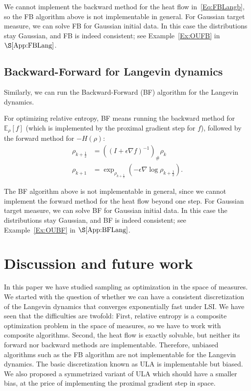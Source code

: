 \documentclass[final,12pt]{colt2018}
\newcommand{\E}{\mathbb{E}}
\begin{document}
We cannot implement the backward method for the heat flow in~\eqref{Eq:FBLangb}, so the FB algorithm above is not implementable in general.
For Gaussian target measure, we can solve FB for Gaussian initial data.
In this case the distributions stay Gaussian, and FB is indeed consistent;
see Example~\ref{Ex:OUFB} in $\S\ref{App:FBLang}$.


\subsection{Backward-Forward for Langevin dynamics}
\label{App:BFLang}

Similarly, we can run the Backward-Forward (BF) algorithm for the Langevin dynamics.

For optimizing relative entropy, BF means running the backward method for $\E_\rho[f]$ (which is implemented by the proximal gradient step for $f$), followed by the forward method for $-H(\rho)$:
\begin{subequations}\label{Eq:BFLang}
\begin{align}
\rho_{k+\frac{1}{2}} &= \left((I + \epsilon \nabla f)^{-1}\right)_\# \rho_k \label{Eq:BFLanga} \\
\rho_{k+1} &= \exp_{\rho_{k+\frac{1}{2}}}(-\epsilon \nabla \log \rho_{k+\frac{1}{2}}). \label{Eq:BFLangb}
\end{align}
\end{subequations}

The BF algorithm above is not implementable in general, since we cannot implement the forward method for the heat flow beyond one step.
For Gaussian target measure, we can solve BF for Gaussian initial data.
In this case the distributions stay Gaussian, and BF is indeed consistent;
see Example~\ref{Ex:OUBF} in $\S\ref{App:BFLang}$.


\section{Discussion and future work}
\label{Sec:Disc}

In this paper we have studied sampling as optimization in the space of measures. We started with the question of whether we can have a consistent discretization of the Langevin dynamics that converges exponentially fast under LSI. We have seen that the difficulties are twofold: First, relative entropy is a composite optimization problem in the space of measures, so we have to work with composite algorithms. Second, the heat flow is exactly solvable, but neither its forward nor backward methods are implementable. Therefore, unbiased algorithms such as the FB algorithm are not implementable for the Langevin dynamics. The basic discretization known as ULA is implementable but biased. We also proposed a symmetrized variant of ULA which should have a smaller bias, at the price of implementing the proximal gradient step in space.
\end{document}
